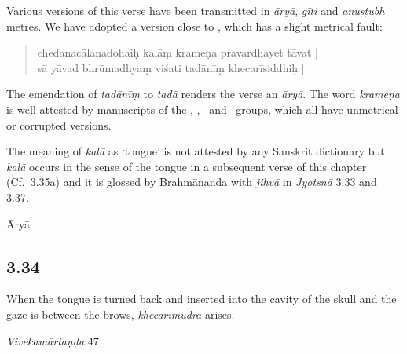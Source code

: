 \begin{ekdosis}
\begin{philcomm}[hp03_033]
Various versions of this verse have been transmitted in \emph{āryā}, \emph{gīti} and \emph{anuṣṭubh} metres. We have adopted a version close to \alphaTwo, which has a slight metrical fault:
\begin{quote}
 chedanacālanadohaiḥ kalāṃ krameṇa pravardhayet tāvat |\\
 sā yāvad bhrūmadhyaṃ viśati tadānīṃ khecarīsiddhiḥ ||
\end{quote}
The emendation of \emph{tadānīṃ} to \emph{tadā} renders the verse an \emph{āryā}. The word \emph{krameṇa} is well attested by manuscripts of the \textalpha, \textbeta, \texteta\ and  \textzeta\ groups, which all have unmetrical or corrupted versions.\lb 

The meaning of \emph{kalā} as `tongue' is not attested by any Sanskrit dictionary but \emph{kalā} occurs in the sense of the tongue in a subsequent verse of this chapter (Cf.~3.35a) and it is glossed by Brahmānanda with \emph{jihvā} in \emph{Jyotsnā} 3.33 and 3.37.
%
\end{philcomm}

\begin{metre}[hp03_033]
Āryā
\end{metre}

\subsection*{3.34}
\begin{translation}[hp03_034]
When the tongue is turned back and inserted into the cavity of the skull and the gaze is between the brows, \emph{khecarīmudrā} arises.
\end{translation}

\begin{sources}[hp03_034]
\emph{Vivekamārtaṇḍa} 47
\begin{versinnote}
\end{versinnote}
\end{sources}


\end{ekdosis}
